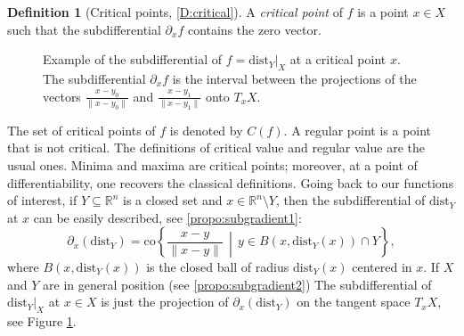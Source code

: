 \documentclass{amsart}
\newcommand{\R}{\mathbb{R}}
\newcommand{\dd}{\mathrm{dist}}
\newcommand{\dist}{{\mathrm{dist}_Y|_X}}
\theoremstyle{definition}
\newtheorem{definition}[subsubsection]{Definition}
\theoremstyle{remark}
\begin{document}
\begin{definition}[Critical points, \cref{D:critical}]
A \emph{critical point} of $f$ is a point $x\in X$ such that the subdifferential $\partial_xf$ contains the zero vector.
\end{definition}

\begin{figure}
\centering


\caption{Example of the subdifferential of $f = \dist$ at a critical point $x$. The subdifferential $\partial_x f$ is the interval between the projections of the vectors $\frac{x - y_0}{\| x - y_0 \|}$ and $\frac{x - y_1}{\| x - y_1 \|}$ onto $T_x X$.}
\label{F:distance-subdifferentialintro}
\end{figure}


The set of critical points of $f$ is denoted by $C(f)$. A regular point is a point that is not critical.  
The definitions of critical value and regular value are the usual ones. Minima and maxima are critical points; moreover, at a point of differentiability, one recovers the classical definitions. Going back to our functions of interest, if $Y \subseteq \R^n$ is a closed set and $x \in \R^n \setminus Y$, then the subdifferential of $\dd_Y$ at $x$ can be easily described, see \cref{propo:subgradient1}:
\[\label{eq:subintro}
\partial_x(\dd_Y) = \mathrm{co}\left\{
\frac{x - y}{\|x - y\|} \,\middle|\, y \in B(x, \dd_Y(x)) \cap Y \right\},
\]
where $B(x, \dd_Y(x))$ is the closed ball of radius $\dd_Y(x)$ centered in $x$.
If $X$ and $Y$ are in general position (see \cref{propo:subgradient2}) The subdifferential of $\dist$ at $x\in X$ is just the projection of $\partial_x(\dd_Y) $ on the tangent space $T_xX$, see Figure \ref{F:distance-subdifferentialintro}.
\end{document}
